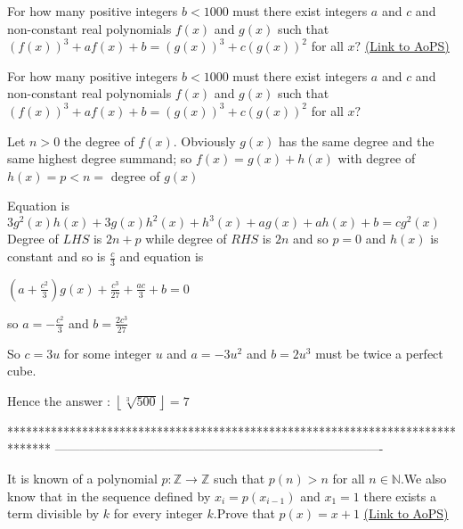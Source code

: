 \begin{problem}
	For how many positive integers $b<1000$ must there exist integers $a$ and $c$ and non-constant real polynomials $f(x)$ and $g(x)$ such that $(f(x))^3+af(x)+b=(g(x))^3+c(g(x))^2$ for all $x?$
	\flushright \href{https://artofproblemsolving.com/community/c6h530521}{(Link to AoPS)}
\end{problem}



\begin{solution}
	\begin{tcolorbox}For how many positive integers $b<1000$ must there exist integers $a$ and $c$ and non-constant real polynomials $f(x)$ and $g(x)$ such that $(f(x))^3+af(x)+b=(g(x))^3+c(g(x))^2$ for all $x?$\end{tcolorbox}
Let $n>0$ the degree of $f(x)$. Obviously $g(x)$ has the same degree and the same highest degree summand;
so $f(x)=g(x)+h(x)$ with degree of $h(x)=p<n=$ degree of $g(x)$

Equation is $3g^2(x)h(x)+3g(x)h^2(x)+h^3(x)+ag(x)+ah(x)+b=cg^2(x)$
Degree of $LHS$ is $2n+p$ while degree of $RHS$ is $2n$ and so $p=0$ and $h(x)$ is constant and so is $\frac c3$ and equation is 

$(a+\frac{c^2}3)g(x)+\frac{c^3}{27}+\frac {ac}3+b=0$

so $a=-\frac{c^2}3$ and $b=\frac {2c^3}{27}$

So $c=3u$ for some integer $u$ and $a=-3u^2$ and $b=2u^3$ must be twice a perfect cube.

Hence the answer : $\boxed{\left\lfloor\sqrt[3]{500}\right\rfloor=7}$
\end{solution}
*******************************************************************************
-------------------------------------------------------------------------------

\begin{problem}
	It is known of a polynomial $p:\mathbb{Z}\longrightarrow\mathbb{Z}$ such that $p(n)> n$ for all $n\in\mathbb{N}$.We also know that in the sequence defined by $x_{i} =p(x_{i-1})$ and $x_1=1$ there exists a term divisible by $k$ for every integer $k$.Prove that $p(x)=x+1$
	\flushright \href{https://artofproblemsolving.com/community/c6h531187}{(Link to AoPS)}
\end{problem}



